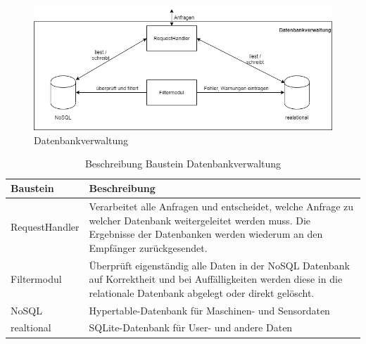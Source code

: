 \begin{figure}
	\centering
	\includegraphics[width=1\textwidth]{Graphics/datenbankverwaltung.png}
	\caption{Datenbankverwaltung}
	\label{fig:datenbankverwaltung}
\end{figure}

\begin{table}[th]
	\begin{tabularx}{\textwidth}{|p{5cm}| X|}
		\hline
		Baustein & Beschreibung\\
		\hline
		RequestHandler & Verarbeitet alle Anfragen und entscheidet, welche Anfrage zu welcher Datenbank weitergeleitet werden muss. Die Ergebnisse der Datenbanken werden wiederum an den Empfänger zurückgesendet. \\
		\hline
		Filtermodul & Überprüft eigenständig alle Daten in der NoSQL Datenbank auf Korrektheit und bei Auffälligkeiten werden diese in die relationale Datenbank abgelegt oder direkt gelöscht.\\
		\hline
		NoSQL & Hypertable-Datenbank für Maschinen- und Sensordaten\\
		\hline
		realtional & SQLite-Datenbank für User- und andere Daten\\
		\hline
	\end{tabularx} 
	\caption{Beschreibung Baustein Datenbankverwaltung}
	\label{tab:Datenbankverwaltung}
\end{table}